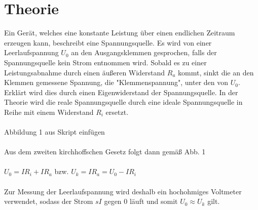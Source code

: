 \section{Theorie}
\label{sec:Theorie}

Ein Gerät, welches eine konstante Leistung über
einen endlichen Zeitraum erzeugen kann, beschreibt eine Spannungsquelle. Es wird von einer Leerlaufspannung $ U_0 $
an den Ausgangsklemmen gesprochen, falls der Spannungsquelle kein Strom entnommen wird.
Sobald es zu einer Leistungsabnahme durch einen äußeren Widerstand $ R_a $ kommt,
sinkt die an den Klemmen gemessene Spannung, die "Klemmenspannung", unter den von $ U_0 $. Erklärt wird
dies durch einen Eigenwiderstand der Spannungsquelle. In der Theorie wird die reale
Spannungsquelle durch eine ideale Spannungsquelle in Reihe mit einem Widerstand $ R_i$
ersetzt.
\\
\\
{\huge Abbildung 1 aus Skript einfügen}
\\
\\
Aus dem zweiten kirchhoffschen Gesetz folgt dann gemäß Abb. 1
\\
\\
$ U_0 = I R_i + I R_a $ bzw. $ U_k = I R_a = U_0-IR_i$
\\
\\
Zur Messung der Leerlaufspannung wird deshalb ein hochohmiges Voltmeter verwendet,
sodass der Strom $sI$ gegen $0$ läuft und somit $ U_0 \approx U_k$ gilt.


